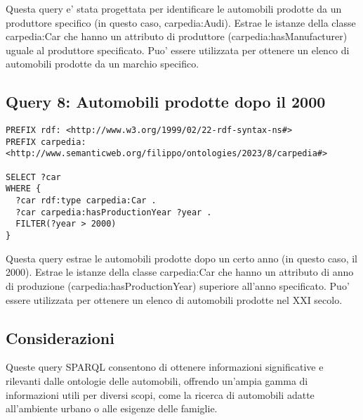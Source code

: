 Questa query e' stata progettata per identificare le automobili prodotte da un produttore specifico
(in questo caso, carpedia:Audi). Estrae le istanze della classe carpedia:Car che hanno un attributo di produttore
(carpedia:hasManufacturer) uguale al produttore specificato. Puo' essere utilizzata per ottenere un elenco
di automobili prodotte da un marchio specifico.

\subsection{Query 8: Automobili prodotte dopo il 2000}

\begin{lstlisting}[language=SPARQL]
PREFIX rdf: <http://www.w3.org/1999/02/22-rdf-syntax-ns#>
PREFIX carpedia: <http://www.semanticweb.org/filippo/ontologies/2023/8/carpedia#>

SELECT ?car
WHERE {
  ?car rdf:type carpedia:Car .
  ?car carpedia:hasProductionYear ?year .
  FILTER(?year > 2000)
}
\end{lstlisting}


Questa query estrae le automobili prodotte dopo un certo anno (in questo caso, il 2000).
Estrae le istanze della classe carpedia:Car che hanno un attributo di anno di produzione (carpedia:hasProductionYear)
superiore all'anno specificato.
Puo' essere utilizzata per ottenere un elenco di automobili prodotte nel XXI secolo.


\subsection{Considerazioni}
Queste query SPARQL consentono di ottenere informazioni significative e rilevanti dalle ontologie delle automobili,
offrendo un'ampia gamma di informazioni utili per diversi scopi, come la ricerca di automobili adatte all'ambiente
urbano o alle esigenze delle famiglie.
